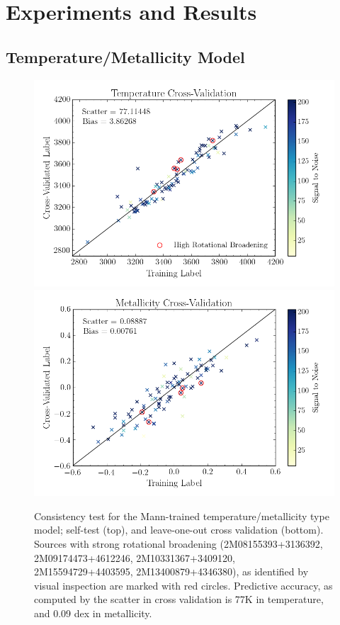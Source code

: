 \documentclass[twocolumn]{aastex62}
\begin{document}
\section{Experiments and Results} \label{sec:results}

\subsection{Temperature/Metallicity Model \label{subsec:mann_results}}

\begin{figure}
	\includegraphics[width=\linewidth]{crv_test_teff.png}
	\includegraphics[width=\linewidth]{crv_test_fe_h.png}
	\caption{Consistency test for the Mann-trained temperature/metallicity type model; self-test (top), and leave-one-out cross validation (bottom). Sources with strong rotational broadening (2M08155393+3136392, 2M09174473+4612246, 2M10331367+3409120, 2M15594729+4403595, 2M13400879+4346380), as identified by visual inspection are marked with red circles. Predictive accuracy, as computed by the scatter in cross validation is 77K in temperature, and 0.09 dex in metallicity.} 
	\label{fig:mann_validation}
\end{figure}
\end{document}

